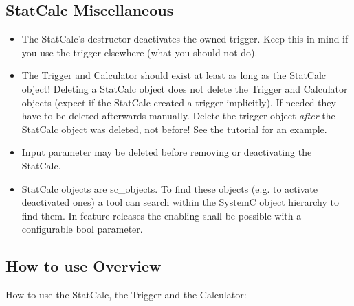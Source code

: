 \subsection{StatCalc Miscellaneous}
\label{GAVStatCalcMiscellaneous}

\begin{itemize}

  \item  The StatCalc's destructor deactivates the owned trigger. Keep this in mind if you use the trigger elsewhere (what you should not do).

  \item  The Trigger and Calculator should exist at least as long as the StatCalc object! Deleting a StatCalc object does not delete the Trigger and Calculator objects (expect if the StatCalc created a trigger implicitly). If needed they have to be deleted afterwards manually. \newline
  	\WarningSymbol{} Delete the trigger object {\em after} the StatCalc object was deleted, not before! See the \GreenAV tutorial for an example.
	
 \item  Input parameter may be deleted before removing or deactivating the StatCalc.
 
 \item  StatCalc objects are {\sffamily sc\_object}s. To find these objects (e.g. to activate deactivated ones) a tool can search within the SystemC object hierarchy to find them. \newline
 In feature releases the enabling shall be possible with a configurable bool parameter. %
 
\end{itemize}



\subsection{How to use Overview}
\label{GAVHowToUseOverview}

How to use the StatCalc, the Trigger and the Calculator: 

